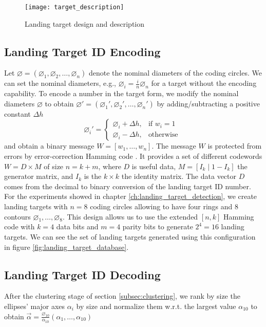 \begin{figure}[!ht]
\centering
\texttt{[image: target\_description]}
\caption{Landing target design and description}
\label{fig:target_description}
\end{figure}

\subsection{Landing Target ID Encoding}
Let $\varnothing=\left( \diameter_{1}, \diameter_{2},\ldots,\diameter_{n}\right) $ denote the nominal diameters of the coding circles. We can set the nominal diameters, e.g., $\diameter_{i}=\frac{i}{n}\diameter_{n}$ for a target without the encoding capability. To encode a number in the target form, we modify the nominal diameters $\varnothing$ to obtain $\varnothing'=\left( \diameter_{1}', \diameter_{2}',\ldots,\diameter_{n}'\right) $ by adding/subtracting a positive constant $\Delta h$
\begin{equation}
\diameter_{i}'=
\begin{cases}
  \diameter_{i}+\Delta h, & \text{if } w_{i}=1 \\
  \diameter_{i}- \Delta h, & \text{otherwise }
\end{cases}
\end{equation}
and obtain a binary message  $W=[w_{1}, \dots,w_{n}]$. The message $W$ is protected from errors by error-correction Hamming code  \citep{Hamming:BSTJ:1950}. It provides a set of different codewords $W= D\times M$ of size $n=k+m$, where $D$ is useful data, $ M=[I_{k}\mid 1-I_{k}]$ the generator matrix, and $I_{k}$ is the $k\times k$ the identity matrix. The data vector $D$ comes from the decimal to binary conversion of the landing target ID number. For the experiments showed in chapter \ref{ch:landing_target_detection}, we create landing targets with $n=8$ coding circles allowing to have four rings and $8$ contours $\diameter_{1}, \ldots, \diameter_{8}$. This design allows us to use the extended $[n,k]$ Hamming code with $k=4$ data bits and $m=4$ parity bits to generate $2^{4}=16$ landing targets. We can see the set of landing targets generated using this configuration in figure \ref{fig:landing_target_database}.

\subsection{Landing Target ID Decoding}
After the clustering stage of section \ref{subsec:clustering}, we rank by size the ellipses' major axes $\alpha_i$ by size and normalize them w.r.t. the largest value $\alpha_{10}$ to obtain %
$\vec{\alpha}=  \frac{\diameter_{10}}{\alpha_{10}} (\alpha_{1}, \ldots, \alpha_{10})$

